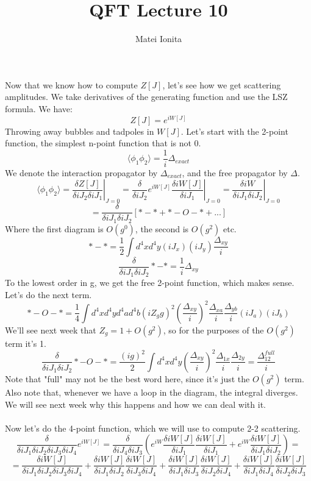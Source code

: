 \documentclass[12 pt]{article}
\title{QFT Lecture 10}
\author{Matei Ionita}
\begin{document}
  \maketitle

Now that we know how to compute $Z[J]$, let's see how we get scattering amplitudes. We take derivatives of the generating function and use the LSZ formula. We have:
\[   Z[J] = e^{iW[J]}  \]
Throwing away bubbles and tadpoles in $W[J]$. Let's start with the 2-point function, the simplest n-point function that is not 0.
\[   \langle \phi_1 \phi_2 \rangle = \frac{1}{i} \Delta_{exact}  \]
We denote the interaction propagator by $\Delta_{exact}$, and the free propagator by $\Delta$.
\[   \langle \phi_1 \phi_2 \rangle =  \left. \frac{\delta Z[J]}{\delta i J_2 \delta i J_1} \right|_{J=0} = \frac{\delta}{\delta iJ_2}\left. e^{iW[J]}\frac{\delta i W[J]}{ \delta i J_1} \right|_{J=0} =\left. \frac{\delta iW}{\delta iJ_1 \delta i J_2} \right|_{J=0}  \]
\[  =  \frac{\delta }{\delta iJ_1 \delta i J_2} \left[  *-* + *-O-* + ...   \right] \]
Where the first diagram is $O(g^0)$, the second is $O(g^2)$ etc.
\[  *-* = \frac{1}{2} \int d^4 x d^4 y (iJ_x) (iJ_y) \frac{\Delta_{xy}}{i}   \]
\[   \frac{\delta }{\delta iJ_1 \delta i J_2}  *-* = \frac{1}{i} \Delta_{xy}  \]
To the lowest order in g, we get the free 2-point function, which makes sense. Let's do the next term.
\[   *-O-* = \frac{1}{4} \int d^4 x d^4 y d^4 a d^4 b (iZ_g g)^2 \left(  \frac{\Delta_{xy}}{i}   \right)^2 \frac{\Delta_{xa}}{i} \frac{\Delta_{yb}}{i} (iJ_a) (iJ_b) \]
We'll see next week that $Z_g = 1 + O(g^2)$, so for the purposes of the $O(g^2)$ term it's 1.
\[    \frac{\delta }{\delta iJ_1 \delta i J_2} *-O-* = \frac{(ig)^2}{2} \int d^4 x d^4 y \left( \frac{\Delta_{xy}}{i} \right)^2 \frac{\Delta_{1x}}{i} \frac{\Delta_{2y}}{i} = \frac{\Delta_{12}^{full}}{i} \]
Note that "full" may not be the best word here, since it's just the $O(g^2)$ term. Also note that, whenever we have a loop in the diagram, the integral diverges. We will see next week why this happens and how we can deal with it.
\\
\\
Now let's do the 4-point function, which we will use to compute 2-2 scattering.
\[  \frac{\delta }{\delta iJ_1 \delta i J_2 \delta iJ_3 \delta i J_4} e^{iW[J]} =   \frac{\delta }{\delta iJ_4 \delta i J_3} \left(  e^{iW} \frac{\delta i W[J]}{ \delta i J_1} \frac{\delta i W[J]}{ \delta i J_1} + e^{iW} \frac{\delta i W[J]}{ \delta i J_1 \delta i J_2}  \right)  =  \]
\[   = \frac{\delta i W[J]}{ \delta i J_1 \delta i J_2 \delta i J_3 \delta i J_4}  +  \frac{\delta i W[J]}{ \delta i J_1 \delta i J_2} \frac{\delta i W[J]}{ \delta i J_3 \delta i J_4} + \frac{\delta i W[J]}{ \delta i J_1 \delta i J_3} \frac{\delta i W[J]}{ \delta i J_2 \delta i J_4} + \frac{\delta i W[J]}{ \delta i J_1 \delta i J_4} \frac{\delta i W[J]}{ \delta i J_2 \delta i J_3}   \]
\end{document}
